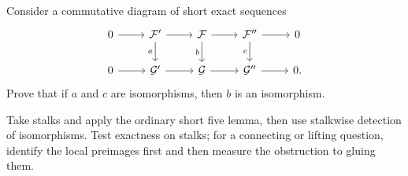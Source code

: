 \begin{problem}\label{chal:vi16-01}
Consider a commutative diagram of short exact sequences
\[
\begin{tikzcd}
0\arrow[r]&\F'\arrow[r]\arrow[d,"a"']&\F\arrow[r]\arrow[d,"b"']&\F''\arrow[r]\arrow[d,"c"']&0\\
0\arrow[r]&\G'\arrow[r]&\G\arrow[r]&\G''\arrow[r]&0.
\end{tikzcd}
\]
Prove that if $a$ and $c$ are isomorphisms, then $b$ is an isomorphism.
\end{problem}
\begin{hint}
Take stalks and apply the ordinary short five lemma, then use stalkwise detection of isomorphisms. Test exactness on stalks; for a connecting or lifting question, identify the local preimages first and then measure the obstruction to gluing them.
\end{hint}
